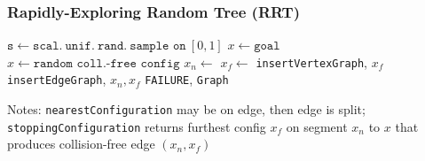 \subsubsection{Rapidly-Exploring Random Tree (RRT)}
\begin{algorithm}
    \small
    \begin{algorithmic}[1]
            \State {}
                \State $\texttt{s} \gets \texttt{scal.}\ \texttt{unif.}\ \texttt{rand.}\ \texttt{sample on}\ [0, 1]$
                    \State $x \gets \texttt{goal}$
                \Else
                    \State $x \gets \texttt{random coll.-free config}$
                \EndIf
                \State $x_n \gets$ 
                \State $x_f \gets$ 
                    \State \texttt{insertVertex}{\texttt{Graph}, $x_f$}
                    \State {}
                    \State \texttt{insertEdge}{\texttt{Graph}, $x_n, x_f$}
                \EndIf
                    \State {}
                \EndIf
            \EndFor
            \State \Return \texttt{FAILURE}, \texttt{Graph}
        \EndProcedure
    \end{algorithmic}
\end{algorithm}
Notes: \texttt{nearestConfiguration} may be on edge, then edge is split;
\texttt{stoppingConfiguration} returns furthest config $x_f$ on segment $x_n$ to $x$ that produces collision-free edge $(x_n, x_f)$

